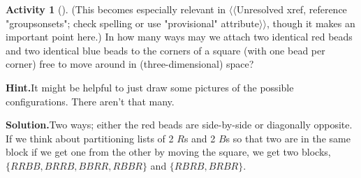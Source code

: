 \documentclass[10pt,]{book}
\theoremstyle{plain}
\theoremstyle{definition}
\newtheorem{activity}[project]{Activity}
\numberwithin{equation}{chapter}
\begin{document}
\begin{activity}[]\label{twocolorsofbeads}
(This becomes especially relevant in {$\langle\langle$Unresolved xref, reference "groupsonsets"; check spelling or use "provisional" attribute$\rangle\rangle$}, though it makes an important point here.) In how many ways may we attach two identical red beads and two identical blue beads to the corners of a square (with one bead per corner) free to move around in (three-dimensional) space?%
\par\medskip\noindent%
\textbf{Hint.}\quad It might be helpful to just draw some pictures of the possible configurations. There aren’t that many.\par\medskip\noindent%
\textbf{Solution.}\quad Two ways; either the red beads are side-by-side or diagonally opposite. If we think about partitioning lists of 2 \(R\)s and 2 \(B\)s so that two are in the same block if we get one from the other by moving the square, we get two blocks, \(\{RRBB, BRRB, BBRR, RBBR\}\) and \(\{RBRB, BRBR\}\).%
\end{activity}
\end{document}
